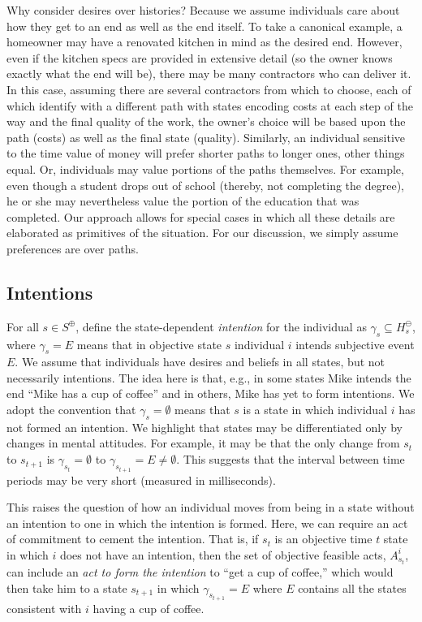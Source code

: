 \documentclass[
11pt,
titlepage,
reqno,
]{article}%
\theoremstyle{definition}
\begin{document}
	
Why consider desires over histories? 
Because we assume individuals care about how they get to an end as well as the end itself. 
To take a canonical example, a homeowner may have a renovated kitchen in mind as the desired end. 
However, even if the kitchen specs are provided in extensive detail (so the owner knows exactly what the end will be), there may be many contractors who can deliver it. 
In this case, assuming there are several contractors from which to choose, each of which identify with a different path with states encoding costs  at each step of the way and the final quality of the work, the owner's choice will be based upon the path (costs) as well as the final state (quality). 
Similarly, an individual sensitive to the time value of money will prefer shorter paths to longer ones, other things equal. 
Or, individuals may value portions of the paths themselves.
For example, even though a student drops out of school (thereby, not completing the degree), he or she may nevertheless value the portion of the education that was completed. 
Our approach allows for special cases in which all these details are elaborated as primitives of the situation. For our discussion, we simply assume preferences are over paths.    


	
	
\subsection{Intentions} \label{sec: intentions}
	
For all $s\in S^\oplus$, define the state-dependent \textit{intention} for the individual as $\gamma_s\subseteq H^\ominus_s$, where $\gamma_s=E$ means that in objective state $s$ individual $i$ intends subjective event $E$. 
We assume that individuals have desires and beliefs in all states, but not necessarily intentions. 
The idea here is that, e.g., in some states Mike intends the end ``Mike has a cup of coffee'' and in others, Mike has yet to form intentions.
We adopt the convention that $\gamma_s=\emptyset$ means that $s$ is a state in which individual $i$ has not formed an intention. 
We highlight that states may be differentiated only by changes in mental attitudes. 
For example, it may be that the only change from $s_t$ to $s_{t+1}$ is $\gamma_{s_t}=\emptyset$ to $\gamma_{s_{t+1}}=E\ne\emptyset$.
This suggests that the interval between time periods may be very short (measured in milliseconds).
	
This raises the question of how an individual moves from being in a state without an intention to one in which the intention is formed. 
Here, we can require an act of commitment to cement the intention. 
That is, if $s_t$ is an objective time $t$ state in which $i$ does not have an intention, then the set of objective feasible acts, $A^i_{s_t}$, can include an \textit{act to form the intention} to ``get a cup of coffee,'' which would then take him to a state $s_{t+1}$ in which $\gamma_{s_{t+1}}=E$ where $E$ contains all the states consistent with $i$ having a cup of coffee.
	
\end{document}
